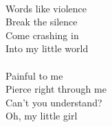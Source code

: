 \\
Words like violence \\
Break the silence \\
Come crashing in \\
Into my little world \\
\\
Painful to me \\
Pierce right through me \\
Can't you understand? \\
Oh, my little girl \\

%
%
%

